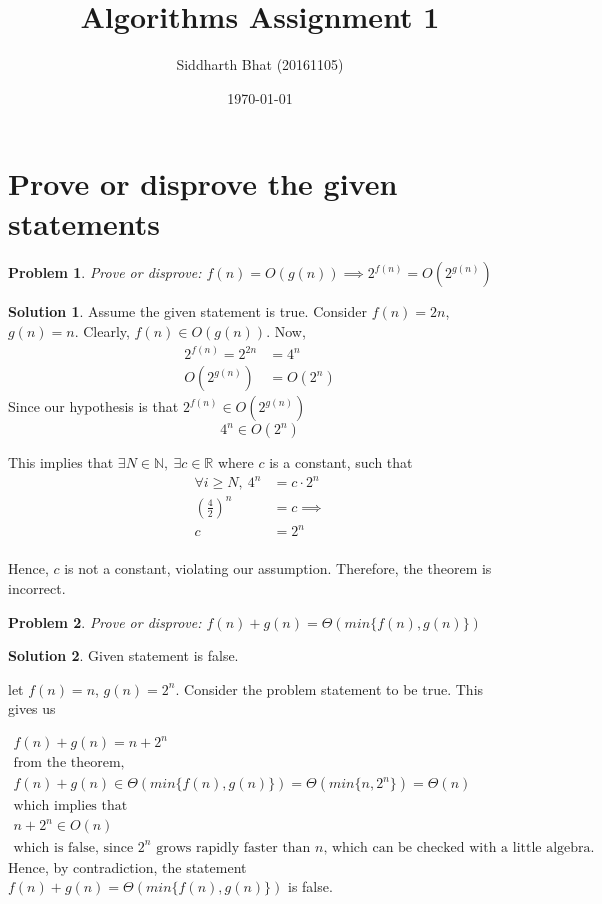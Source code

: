 \documentclass[11pt]{article}
\newtheorem*{problem}{Problem}
\theoremstyle{definition}
\newtheorem*{solution}{Solution}
\begin{document}
\title{Algorithms Assignment 1}
\author{Siddharth Bhat (20161105)}
\date{\today}
\maketitle

\section{Prove or disprove the given statements}
\begin{problem}
    Prove or disprove: $f(n) = O(g(n)) \implies 2^{f(n)} = O(2^{g(n)})$
\end{problem}
\begin{solution}
    Assume the given statement is true. 
    Consider $f(n) = 2n$, $g(n) = n$. Clearly, $f(n) \in O(g(n))$.
    Now,
    \begin{align*}
        2^{f(n)} = 2^{2n} &= 4^n \\
        O(2^{g(n)}) &= O(2^n)
    \end{align*}
     Since our hypothesis is that $2^{f(n)} \in O(2^{g(n)})$
    $$4^n \in O(2^n)$$
    
This implies that  $\exists N \in \mathbb N,\ \exists c \in \mathbb R$ where $c$ is a constant, such that
	\begin{align*}
        \forall i \geq N, \ 4^n &= c \cdot 2^n \\
        \left ( \frac{4}{2} \right ) ^n &= c \implies \\
        c &= 2^n \\
    \end{align*}

  Hence, $c$ is not a constant, violating our assumption.  
    Therefore, the theorem is incorrect.
\end{solution}

\begin{problem}
    Prove or disprove: $f(n) + g(n) = \Theta(min \{ f(n), g(n) \})$
\end{problem}
\begin{solution}
    Given statement is false.

    let $f(n) = n$, $g(n) = 2^n$. Consider the problem statement to be
    true. This gives us

    \begin{gather*}
        f(n) + g(n) = n + 2^n \\
        \text{from the theorem, } \\
        f(n) + g(n) \in \Theta(min \{ f(n), g(n) \}) = \Theta(min \{n, 2^n \}) = \Theta(n) \\
        \text{which implies that} \\
        n + 2^n \in O(n) \\
        \text{which is false, since $2^n$ grows rapidly faster than $n$, which can
        be checked with a little algebra.}
    \end{gather*}
    Hence, by contradiction, the statement $f(n) + g(n) = \Theta(min \{ f(n), g(n) \})$ is false.
\end{solution}
\end{document}
